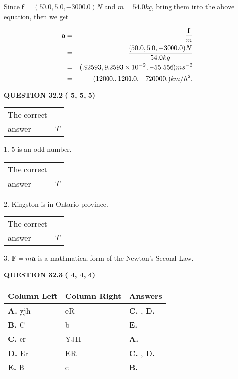 \documentclass[12pt]{article}
\begin{document}
Since $\mathbf{f}=( %
50.0,  %
5.0,  %
-3000.0 )N$
and $m= %
54.0 kg$, bring them into the above equation, then we get
 
\begin{eqnarray*}
\mathbf{a}&=&\frac{\mathbf{f}}m  \\
&=&\frac{(
50.0 ,
5.0 ,
-3000.0 )N
}{ %
54.0 kg}  \\
&=&(
.92593 ,
9.2593 \times 10^{-2},
-55.556
)ms^{-2} \\
&=&(
12000. ,
1200.0 ,
-720000.
)km/h^2.
\end{eqnarray*}
 
  
  
{\textbf{\large{QUESTION
32.2 
 (          5,          5,          5)
}}}

 
\noindent\begin{tabular}{|l|l|}\hline The correct & \\
          answer &  %
$T$ \\ \hline \end{tabular}
1. $ %
5$ is an  %
odd number.
 
\noindent\begin{tabular}{|l|l|}\hline The correct & \\
          answer &  %
$T$ \\ \hline \end{tabular}
2.  %
Kingston is in  %
Ontario province.
 
\noindent\begin{tabular}{|l|l|}\hline The correct & \\
          answer &  %
$T$ \\ \hline \end{tabular}
3.  %
$\mathbf{F}=m\mathbf{a}$ is a mathmatical form of  %
the Newton's Second Law.
 
  
  
{\textbf{\large{QUESTION
32.3 
 (          4,          4,          4)
}}}
 
 
\noindent{}
  
  
\begin{tabular}{|l|l|l|}
 \hline
 Column Left & Column Right  & Answers       \\ 
 \hline
{\textbf{\large{
A.}}}
yjh
  & 
eR
 & 
{\textbf{\large{
C.}}}
, 
{\textbf{\large{
D.}}}
 \\ 
 \hline
{\textbf{\large{
B.}}}
C
  & 
b
 & 
{\textbf{\large{
E.}}}
 \\ 
 \hline
{\textbf{\large{
C.}}}
er
  & 
YJH
 & 
{\textbf{\large{
A.}}}
 \\ 
 \hline
{\textbf{\large{
D.}}}
Er
  & 
ER
 & 
{\textbf{\large{
C.}}}
, 
{\textbf{\large{
D.}}}
 \\ 
 \hline
{\textbf{\large{
E.}}}
B
  & 
c
 & 
{\textbf{\large{
B.}}}
 \\ 
 \hline
 \end{tabular}
  
\end{document}
